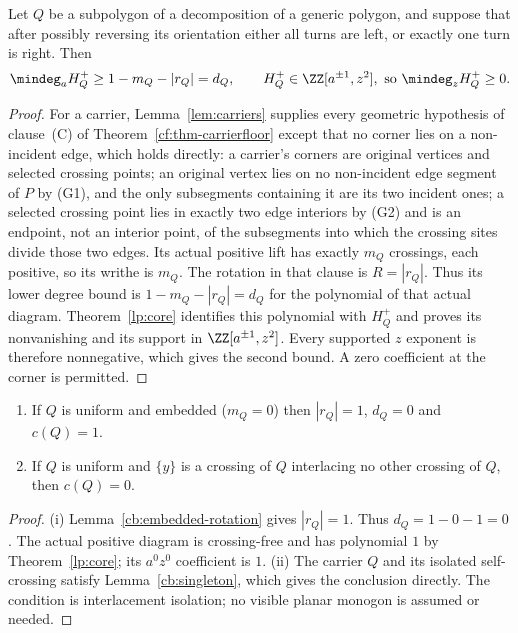 \begin{theorem}\label{thm:floor}\leanok
Let $Q$ be a subpolygon of a decomposition of a generic polygon, and suppose
that after possibly reversing its orientation either all turns are left, or
exactly one turn is right. Then
\[
\mindeg_a H^+_Q\geq 1-m_Q-|r_Q|=d_Q,\qquad
H^+_Q\in\ZZ[a^{\pm1},z^2],\ \text{so }\mindeg_zH^+_Q\geq0.
\]

\end{theorem}
\begin{proof}\leanok{}
For a carrier, Lemma~\ref{lem:carriers} supplies every geometric
hypothesis of clause~(C) of Theorem~\ref{cf:thm-carrierfloor} except that
no corner lies on a non-incident edge, which holds directly: a carrier's
corners are original vertices and selected crossing points; an original
vertex lies on no non-incident edge segment of $P$ by (G1), and the only
subsegments containing it are its two incident ones; a selected crossing
point lies in exactly two edge interiors by (G2) and is an endpoint, not an
interior point, of the subsegments into which the crossing sites divide
those two edges. Its actual positive
lift has exactly $m_Q$ crossings, each positive, so its writhe is $m_Q$.
The rotation in that clause is $R=|r_Q|$. Thus its lower degree bound is
$1-m_Q-|r_Q|=d_Q$ for the polynomial of that actual diagram.
Theorem~\ref{lp:core} identifies this polynomial with $H_Q^+$ and proves
its nonvanishing and its support in $\ZZ[a^{\pm1},z^2]$.
Every supported $z$ exponent is therefore nonnegative, which gives the
second bound. A zero coefficient at the corner is permitted.
\end{proof}

\begin{lemma}\label{lem:corner-values}\leanok
\begin{enumerate}
\item[(i)] If $Q$ is uniform and embedded ($m_Q=0$) then $|r_Q|=1$, $d_Q=0$
and $c(Q)=1$.
\item[(ii)] If $Q$ is uniform and $\{y\}$ is a crossing of $Q$ interlacing no
other crossing of $Q$, then $c(Q)=0$.
\end{enumerate}

\end{lemma}
\begin{proof}\leanok{}
(i) Lemma~\ref{cb:embedded-rotation} gives $|r_Q|=1$. Thus
$d_Q=1-0-1=0$. The actual positive diagram is crossing-free and has
polynomial $1$ by Theorem~\ref{lp:core}; its $a^0z^0$ coefficient is $1$.
(ii) The carrier $Q$ and its isolated self-crossing satisfy
Lemma~\ref{cb:singleton}, which gives the conclusion directly. The
condition is interlacement isolation; no visible planar monogon is
assumed or needed.
\end{proof}


